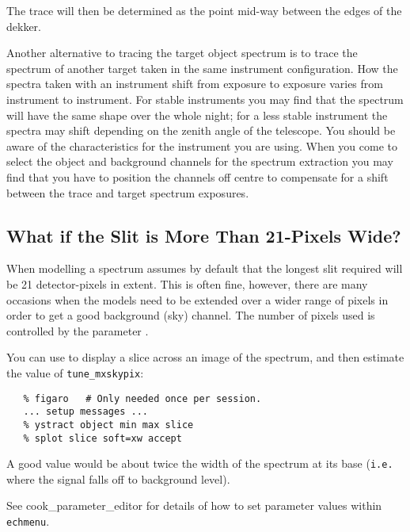 {{The trace will then be determined as the point mid-way between the
edges of the dekker.

Another alternative to tracing the target object spectrum is to trace the
spectrum of another target taken in the same instrument configuration.
How the spectra taken with an instrument shift from exposure to exposure
varies from instrument to instrument.  For stable instruments you may
find that the spectrum will have the same shape over the whole night;
for a less stable instrument the spectra may shift depending on the zenith
angle of the telescope.  You should be aware of the characteristics for the
instrument you are using.  When you come to select the object and background
channels for the spectrum extraction you may find that you have to position
the channels off centre to compensate for a shift between the trace and
target spectrum exposures.


\subsection{What if the Slit is More Than
            21-Pixels Wide?}

When modelling a spectrum  assumes by default
that the longest slit required will be 21 detector-pixels in extent.
This is often fine, however, there are many occasions when the models
need to be extended over a wider range of pixels in order to get a good
background (sky) channel.  The number of pixels used is controlled
by the parameter \@.

You can use  to display a slice across an image
of the spectrum,
and then estimate the value of \verb+tune_mxskypix+:

{
\scspec{\small}{ }
\begin{verbatim}
   % figaro   # Only needed once per session.
   ... setup messages ...
   % ystract object min max slice
   % splot slice soft=xw accept
\end{verbatim}
}

A good value would be about twice the width of the spectrum at its base
({\tt{i.e.\ }} where the signal falls off to background level).

See \scspec{\S\ref{cook_parameter_editor}}
{
{cook_parameter_editor}} for details of how to set parameter values within
\verb+echmenu+\@.


}}
